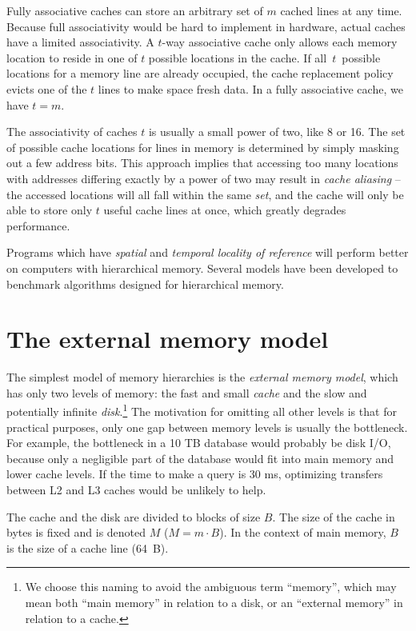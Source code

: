 Fully associative caches can store an arbitrary set of $m$ cached lines
at any time. Because full associativity would be hard to implement in hardware,
actual caches have a limited associativity. A $t$-way associative
cache only allows each memory location to reside in one of $t$ possible
locations in the cache. If all~$t$~possible locations for a memory line
are already occupied, the cache replacement policy evicts one of the $t$
lines to make space fresh data. In a fully associative cache, we have $t=m$.

The associativity of caches $t$ is usually a small power of two, like 8 or 16.
The set of possible cache locations for lines in memory is determined
by simply masking out a few address bits. This approach implies that
accessing too many locations with addresses differing exactly by a power
of two may result in \emph{cache aliasing} -- the accessed locations will
all fall within the same \emph{set}, and the cache will only be able
to store only $t$ useful cache lines at once, which greatly degrades
performance.

Programs which have \emph{spatial} and \emph{temporal locality of reference}
will perform better on computers with hierarchical memory. Several models have
been developed to benchmark algorithms designed for hierarchical memory.

\section{The external memory model}
The simplest model of memory hierarchies is the \emph{external memory model},
which has only two levels of memory: the fast and small \emph{cache} and the
slow and potentially infinite \emph{disk}.\footnote{%
	We choose this naming to avoid the ambiguous term ``memory'',
	which may mean both ``main memory'' in relation to a disk,
	or an ``external memory'' in relation to a cache.
} The motivation for omitting all other levels is that for practical purposes,
only one gap between memory levels is usually the bottleneck. For example,
the bottleneck in a 10 TB database would probably be disk I/O, because
only a negligible part of the database would fit into main memory and
lower cache levels. If the time to make a query is 30 ms, optimizing transfers
between L2 and L3 caches would be unlikely to help.

The cache and the disk are divided to blocks of size $B$. The size of the cache 
in bytes is fixed and is denoted $M$ ($M=m\cdot B$).
In the context of main memory, $B$ is the size of a cache line (64~B).

